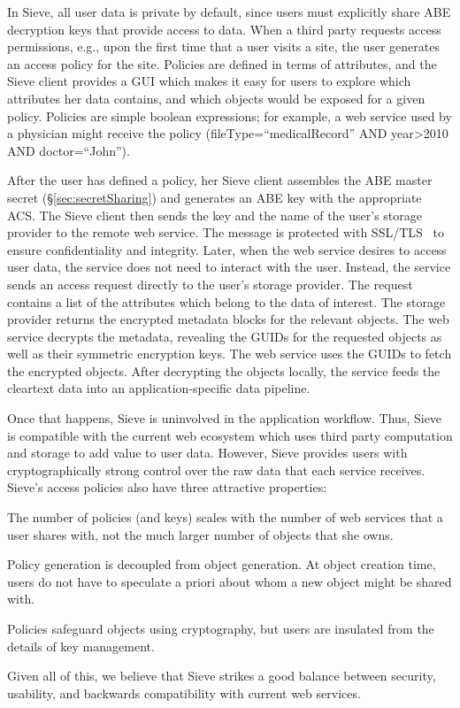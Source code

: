 In Sieve, all user data is private by
default, since users must explicitly
share ABE decryption keys that provide
access to data. When a third party requests
access permissions, e.g., upon the first
time that a user visits a site, the user
generates an access policy for the site.
Policies are defined in terms of attributes,
and the Sieve client provides a GUI which
makes it easy for users to explore which
attributes her data contains, and which
objects would be exposed for a given policy.
Policies are simple boolean expressions;
for example, a web service used by a
physician might receive the policy
(fileType=``medicalRecord''
AND year>2010 AND doctor=``John'').

After the user has defined a policy, her
Sieve client assembles the ABE master secret
(\S\ref{sec:secretSharing}) and generates
an ABE key with the appropriate ACS. The
Sieve client then sends the key and the name
of the user's storage provider to the remote
web service. The message is protected with SSL/TLS~\cite{tls}
to ensure confidentiality and integrity.
Later, when the web service desires to
access user data, the service does not
need to interact with the user. Instead,
the service sends an access request directly
to the
user's storage provider. The request
contains a list of the attributes which
belong to the data of interest. The
storage provider returns the encrypted
metadata blocks for the relevant objects.
The web service decrypts the metadata,
revealing the GUIDs for the requested
objects as well as their symmetric
encryption keys. The web service uses the
GUIDs to fetch the encrypted objects.
After decrypting the objects locally,
the service feeds the cleartext data
into an application-specific data pipeline.

Once that happens, Sieve is uninvolved in
the application workflow. Thus, Sieve is
compatible with the current web ecosystem
which uses third party computation and
storage to add value to user data. However,
Sieve provides users with cryptographically
strong control over the raw data that each
service receives. Sieve's access policies
also have three attractive properties:
  \begin{smitemize}
    \item The number of policies (and keys) scales with
          the number of web services that a user
          shares with, not the much larger number
          of objects that she owns.
    \item Policy generation is decoupled from
          object generation. At object creation
          time, users do not have to speculate
          a priori about whom a new object might
          be shared with.
    \item Policies safeguard objects using
          cryptography, but users are insulated
          from the details of key management.
  \end{smitemize}
Given all of this, we believe that Sieve
strikes a good balance between security,
usability, and backwards compatibility with
current web services.


